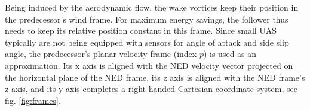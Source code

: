 \documentclass{ifacconf}
\begin{document}
Being induced by the aerodynamic flow, the wake vortices keep their position in the predecessor's wind frame. For maximum energy savings, the follower thus needs to keep its relative position constant in this frame. Since small UAS typically are not being equipped with sensors for angle of attack and side slip angle, the predecessor's planar velocity frame (index $p$) is used as an approximation. Its x axis is aligned with the NED velocity vector projected on the horizontal plane of the NED frame, its z axis is aligned with the NED frame's z axis, and its y axis completes a right-handed Cartesian coordinate system, see fig. \ref{fig:frames}. 
\end{document}
